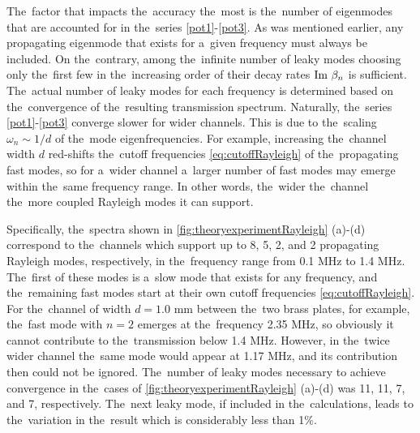 The~factor that impacts the~accuracy the~most is the~number of eigenmodes that are accounted for in the~series \cref{pot1}-\cref{pot3}.
As was mentioned earlier, any propagating eigenmode that exists for a~given frequency must always be included.
On the~contrary, among the~infinite number of leaky modes choosing only the~first few in the~increasing order of their decay rates $\textrm{Im }\beta_n$ is sufficient.
The~actual number of leaky modes for each frequency is determined based on the~convergence of the~resulting transmission spectrum.
Naturally, the~series \cref{pot1}-\cref{pot3} converge slower for wider channels.
This is due to the~scaling $\omega_n \sim 1/d$ of the~mode eigenfrequencies.
For example, increasing the~channel width $d$ red-shifts the~cutoff frequencies \cref{eq:cutoffRayleigh} of the~propagating fast modes, so for a~wider channel a~larger number of fast modes may emerge within the~same frequency range.
In other words, the~wider the~channel the~more coupled Rayleigh modes it can support.

Specifically, the~spectra shown in \cref{fig:theoryexperimentRayleigh} (a)-(d) correspond to the~channels which support up to 8, 5, 2, and 2 propagating Rayleigh modes, respectively, in the~frequency range from 0.1 MHz to 1.4 MHz.
The~first of these modes is a~slow mode that exists for any frequency, and the~remaining fast modes start at their own cutoff frequencies \cref{eq:cutoffRayleigh}.
For the~channel of width $d=1.0$ mm between the~two brass plates, for example, the~fast mode with $n=2$ emerges at the~frequency 2.35 MHz, so obviously it cannot contribute to the~transmission below 1.4 MHz.
However, in the~twice wider channel the~same mode would appear at 1.17 MHz, and its contribution then could not be ignored.
The~number of leaky modes necessary to achieve convergence in the~cases of \cref{fig:theoryexperimentRayleigh} (a)-(d) was 11, 11, 7, and 7, respectively.
The~next leaky mode, if included in the~calculations, leads to the~variation in the~result which is considerably less than 1\%.

